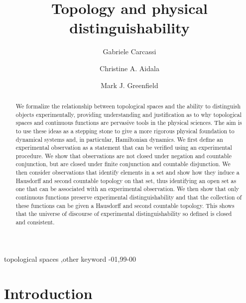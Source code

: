 \documentclass[review]{elsarticle}
\theoremstyle{plain}%
\theoremstyle{definition}
\theoremstyle{remark}
\begin{document}
\begin{frontmatter}

\title{Topology and physical distinguishability}

\author[umich]{Gabriele Carcassi}

\author[umich]{Christine A. Aidala}

\author[umich]{Mark J. Greenfield}

\address[umich]{University of Michigan, Ann Arbor, MI 48109, USA}



\begin{abstract}
We formalize the relationship between topological spaces and the ability to distinguish objects experimentally, providing understanding and justification as to why topological spaces and continuous functions are pervasive tools in the physical sciences. The aim is to use these ideas as a stepping stone to give a more rigorous physical foundation to dynamical systems and, in particular, Hamiltonian dynamics.  We first define an experimental observation as a statement that can be verified using an experimental procedure. We show that observations are not closed under negation and countable conjunction, but are closed under finite conjunction and countable disjunction. We then consider observations that identify elements in a set and show how they induce a Hausdorff and second countable topology on that set, thus identifying an open set as one that can be associated with an experimental observation. We then show that only continuous functions preserve experimental distinguishability and that the collection of these functions can be given a Hausdorff and second countable topology. This shows that the universe of discourse of experimental distinguishability so defined is closed and consistent.


\end{abstract}

\begin{keyword}
topological spaces \sep other keyword
-01\sep  99-00
\end{keyword}

\end{frontmatter}

\linenumbers

\section{Introduction}
\end{document}

